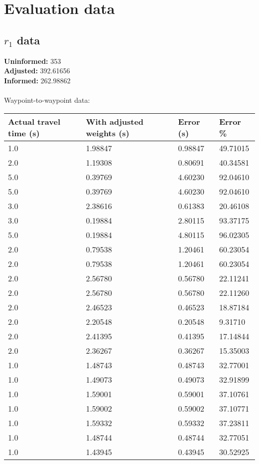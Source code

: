 \chapter{Evaluation data}\label{app:rawevaldata}
\section*{$r_1$ data}
\textbf{Uninformed:} 353\\
\textbf{Adjusted:} 392.61656\\
\textbf{Informed:} 262.98862\\
\\
Waypoint-to-waypoint data:
\begin{longtable}{llll}
	\textbf{Actual travel time (s)} & \textbf{With adjusted weights (s)}    & \textbf{Error (s)} & \textbf{Error \%} \\ \hline
	1.0 & 1.98847 & 0.98847 & 49.71015 \\
	2.0 & 1.19308 & 0.80691 & 40.34581 \\
	5.0 & 0.39769 & 4.60230 & 92.04610 \\
	5.0 & 0.39769 & 4.60230 & 92.04610 \\
	3.0 & 2.38616 & 0.61383 & 20.46108 \\
	3.0 & 0.19884 & 2.80115 & 93.37175 \\
	5.0 & 0.19884 & 4.80115 & 96.02305 \\
	2.0 & 0.79538 & 1.20461 & 60.23054 \\
	2.0 & 0.79538 & 1.20461 & 60.23054 \\
	2.0 & 2.56780 & 0.56780 & 22.11241 \\
	2.0 & 2.56780 & 0.56780 & 22.11260 \\
	2.0 & 2.46523 & 0.46523 & 18.87184 \\
	2.0 & 2.20548 & 0.20548 & 9.31710 \\
	2.0 & 2.41395 & 0.41395 & 17.14844 \\
	2.0 & 2.36267 & 0.36267 & 15.35003 \\
	1.0 & 1.48743 & 0.48743 & 32.77001 \\
	1.0 & 1.49073 & 0.49073 & 32.91899 \\
	1.0 & 1.59001 & 0.59001 & 37.10761 \\
	1.0 & 1.59002 & 0.59002 & 37.10771 \\
	1.0 & 1.59332 & 0.59332 & 37.23811 \\
	1.0 & 1.48744 & 0.48744 & 32.77051 \\
	1.0 & 1.43945 & 0.43945 & 30.52925 \\

\end{longtable}
